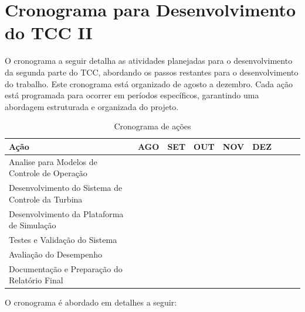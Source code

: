 \section{Cronograma para Desenvolvimento do TCC II}
\par O cronograma a seguir detalha as atividades planejadas para o desenvolvimento da segunda parte do TCC, abordando os passos restantes para o desenvolvimento do trabalho. Este cronograma está organizado de agosto a dezembro. Cada ação está programada para ocorrer em períodos específicos, garantindo uma abordagem estruturada e organizada do projeto.
\begin{table}[h!]
\centering
\caption{Cronograma de ações}
\begin{tabular}{|m{5cm}|m{1cm}|m{1cm}|m{1cm}|m{1cm}|m{1cm}|m{1cm}|m{1cm}|m{1cm}|}
\hline
\textbf{Ação} &\textbf{AGO} & \textbf{SET} & \textbf{OUT} & \textbf{NOV} & \textbf{DEZ} \\ \hline
Analise para Modelos de Controle de Operação &  \cellcolor[gray]{0.8}& \cellcolor[gray]{0.8} & & & \\ \hline
Desenvolvimento do Sistema de Controle da Turbina & \cellcolor[gray]{0.8}  & \cellcolor[gray]{0.8} & \cellcolor[gray]{0.8} & & \\ \hline
Desenvolvimento da Plataforma de Simulação &  &  \cellcolor[gray]{0.8}&  \cellcolor[gray]{0.8}& & \\ \hline
Testes e Validação do Sistema &  &  & \cellcolor[gray]{0.8} & \cellcolor[gray]{0.8} & \\ \hline
Avaliação do Desempenho &  &  & \cellcolor[gray]{0.8} & \cellcolor[gray]{0.8} & \cellcolor[gray]{0.8} \\ \hline
Documentação e Preparação do Relatório Final &  &  &  &  \cellcolor[gray]{0.8}&  \cellcolor[gray]{0.8}\\ \hline
\end{tabular}
\end{table}
\par O cronograma é abordado em detalhes a seguir:
